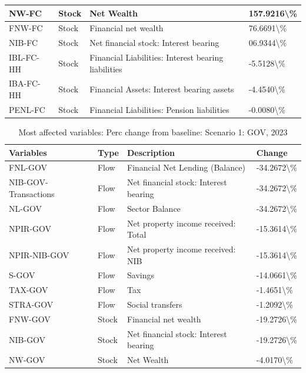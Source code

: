 \documentclass[
]{book}
\begin{document}
\begin{table}
\begin{tabular}[t]{l|l|l|l}
\hline
NW-FC & Stock & Net Wealth & 157.9216\textbackslash{}\%\\
\hline
FNW-FC & Stock & Financial net wealth & 76.6691\textbackslash{}\%\\
\hline
NIB-FC & Stock & Net financial stock: Interest bearing & 06.9344\textbackslash{}\%\\
\hline
IBL-FC-HH & Stock & Financial Liabilities: Interest bearing liabilities & -5.5128\textbackslash{}\%\\
\hline
IBA-FC-HH & Stock & Financial Assets: Interest bearing assets & -4.4540\textbackslash{}\%\\
\hline
PENL-FC & Stock & Financial Liabilities: Pension liabilities & -0.0080\textbackslash{}\%\\
\hline
\end{tabular}
\end{table}

\begin{table}

\caption{\label{tab:most-affected-scenario-1-perc-2023-GOV}Most affected variables: Perc change from baseline: Scenario 1: GOV, 2023}
\centering
\fontsize{10}{12}\selectfont
\begin{tabular}[t]{l|l|l|l}
\hline
Variables & Type & Description & Change\\
\hline
FNL-GOV & Flow & Financial Net Lending (Balance) & -34.2672\textbackslash{}\%\\
\hline
NIB-GOV-Transactions & Flow & Net financial stock: Interest bearing & -34.2672\textbackslash{}\%\\
\hline
NL-GOV & Flow & Sector Balance & -34.2672\textbackslash{}\%\\
\hline
NPIR-GOV & Flow & Net property income received: Total & -15.3614\textbackslash{}\%\\
\hline
NPIR-NIB-GOV & Flow & Net property income received: NIB & -15.3614\textbackslash{}\%\\
\hline
S-GOV & Flow & Savings & -14.0661\textbackslash{}\%\\
\hline
TAX-GOV & Flow & Tax & -1.4651\textbackslash{}\%\\
\hline
STRA-GOV & Flow & Social transfers & -1.2092\textbackslash{}\%\\
\hline
FNW-GOV & Stock & Financial net wealth & -19.2726\textbackslash{}\%\\
\hline
NIB-GOV & Stock & Net financial stock: Interest bearing & -19.2726\textbackslash{}\%\\
\hline
NW-GOV & Stock & Net Wealth & -4.0170\textbackslash{}\%\\
\hline
\end{tabular}
\end{table}
\end{document}
